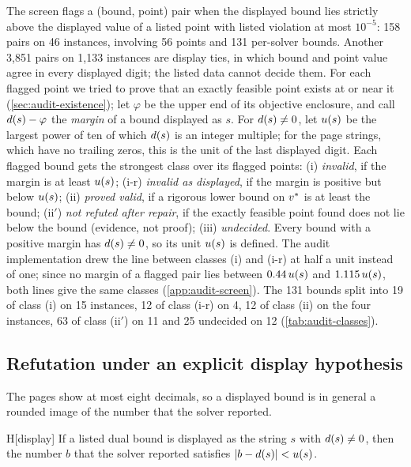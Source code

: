 The screen flags a (bound, point) pair when the displayed bound lies strictly above the displayed value of a listed point with listed violation at most $10^{-5}$: 158 pairs on 46 instances, involving 56 points and 131 per-solver bounds.
Another 3,851 pairs on 1,133 instances are display ties, in which bound and point value agree in every displayed digit; the listed data cannot decide them.
For each flagged point we tried to prove that an exactly feasible point exists at or near it (\cref{sec:audit-existence}); let $\varphi$ be the upper end of its objective enclosure, and call $d(s)-\varphi$ the \emph{margin} of a bound displayed as $s$.
For $d(s)\neq0$, let $u(s)$ be the largest power of ten of which $d(s)$ is an integer multiple; for the page strings, which have no trailing zeros, this is the unit of the last displayed digit.
Each flagged bound gets the strongest class over its flagged points:
(i) \emph{invalid}, if the margin is at least $u(s)$;
(i-r) \emph{invalid as displayed}, if the margin is positive but below $u(s)$;
(ii) \emph{proved valid}, if a rigorous lower bound on $v^{*}$ is at least the bound;
(ii$'$) \emph{not refuted after repair}, if the exactly feasible point found does not lie below the bound (evidence, not proof);
(iii) \emph{undecided}.
Every bound with a positive margin has $d(s)\neq0$, so its unit $u(s)$ is defined.
The audit implementation drew the line between classes (i) and (i-r) at half a unit instead of one; since no margin of a flagged pair lies between $0.44\,u(s)$ and $1.115\,u(s)$, both lines give the same classes (\cref{app:audit-screen}).
The 131 bounds split into 19 of class (i) on 15 instances, 12 of class (i-r) on 4, 12 of class (ii) on the four  instances, 63 of class (ii$'$) on 11 and 25 undecided on 12 (\cref{tab:audit-classes}).

\subsection{Refutation under an explicit display hypothesis}\label{sec:audit-hyp}

The pages show at most eight decimals, so a displayed bound is in general a rounded image of the number that the solver reported.

\begin{hypothesis}{H}[display]\label{hyp:audit-display}
If a listed dual bound is displayed as the string $s$ with $d(s)\neq0$, then the number $b$ that the solver reported satisfies $|b-d(s)|<u(s)$.
\end{hypothesis}

